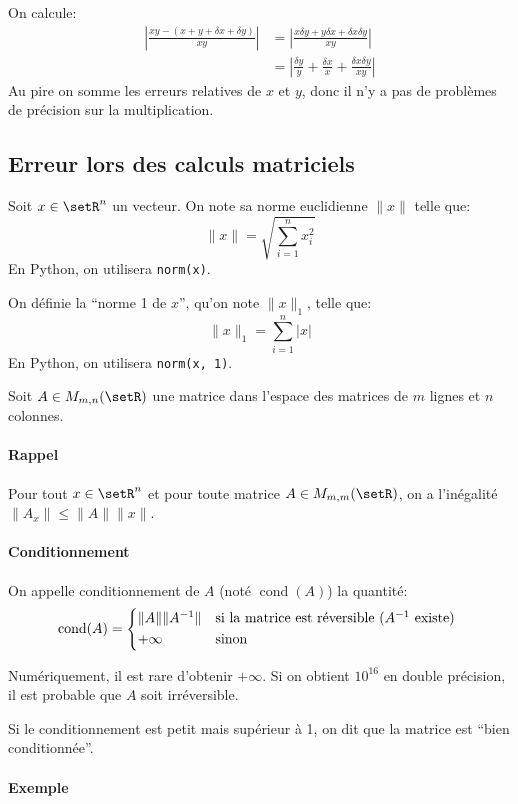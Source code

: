 \documentclass[a4paper,10pt,french,openany]{memoir}
\newcommand{\norm}[1]{\lVert#1\rVert}
\newcommand{\normo}[1]{\norm{#1}_1}
\DeclareMathOperator{\cond}{cond}
\begin{document}
On calcule:
\begin{align*}
 \left|\frac{x y - (x+y+\delta x+\delta y)}{x y}\right| & = \left|\frac{x\delta y + y\delta x + \delta x\delta y}{x y}\right| \\
 & = \left|\frac{\delta y}y + \frac{\delta x}x + \frac{\delta x\delta y}{xy}\right|
\end{align*}
Au pire on somme les erreurs relatives de $x$ et $y$, donc il n'y a pas de problèmes de précision sur la multiplication.

\subsection{Erreur lors des calculs matriciels}

Soit $x\in \setR^n$ un vecteur. On note sa norme euclidienne $\norm{x}$ telle que:
\[ \norm{x} = \sqrt{\sum_{i=1}^n x_i^2} \]
En Python, on utilisera \lstinline{norm(x)}.

On définie la ``norme 1 de $x$'', qu'on note $\normo{x}$, telle que:
\[ \normo x = \sum_{i=1}^n \left|x\right| \]
En Python, on utilisera \lstinline{norm(x, 1)}.

Soit $A \in M_{m,n}(\setR)$ une matrice dans l'espace des matrices de $m$ lignes et $n$ colonnes.

\paragraph{Rappel}
Pour tout $x \in \setR^n$ et pour toute matrice $A \in M_{m, m}(\setR)$, on a l'inégalité $\norm{A_x} \leq \norm{A} \norm{x}$.

\paragraph{Conditionnement} On appelle conditionnement de $A$ (noté $\cond(A)$) la quantité:
\[
    \cond(A) =
    \begin{cases*}
        \norm{A} \norm{A^{-1}} & si la matrice est réversible ($A^{-1}$ existe) \\
        +\infty & sinon
    \end{cases*}
\]

Numériquement, il est rare d'obtenir $+\infty$. Si on obtient $10^{16}$ en double précision, il est probable que $A$ soit irréversible.

Si le conditionnement est petit mais supérieur à 1, on dit que la matrice est ``bien conditionnée''.

\paragraph{Exemple}
\end{document}
